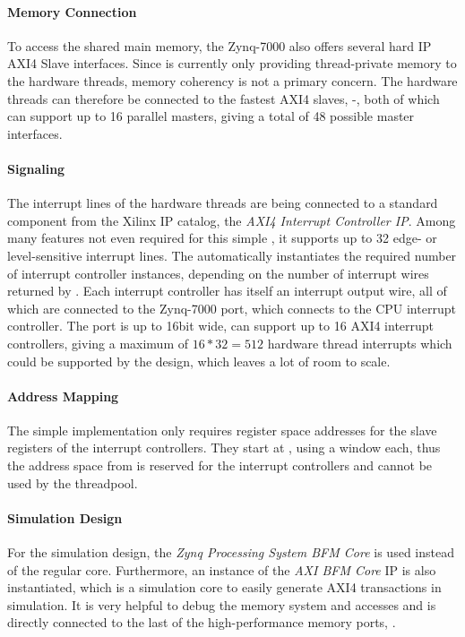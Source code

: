 \paragraph{Memory Connection}
To access the shared main memory, the Zynq-7000 also offers several hard IP AXI4 Slave interfaces.
Since \tpc{} is currently only providing thread-private memory to the hardware threads, memory coherency is not a primary concern.
The hardware threads can therefore be connected to the fastest AXI4 slaves, -, both of which can support up to 16 parallel masters, giving a total of 48 possible master interfaces.

\paragraph{Signaling}
The interrupt lines of the hardware threads are being connected to a standard component from the Xilinx IP catalog, the \emph{AXI4 Interrupt Controller IP}.
Among many features not even required for this simple , it supports up to 32 edge- or level-sensitive interrupt lines.
The  automatically instantiates the required number of interrupt controller instances, depending on the number of interrupt wires returned by .
Each interrupt controller has itself an interrupt output wire, all of which are connected to the Zynq-7000  port, which connects to the CPU interrupt controller.
The  port is up to 16bit wide, can support up to 16 AXI4 interrupt controllers, giving a maximum of $16 * 32 = 512$ hardware thread interrupts which could be supported by the design, which leaves a lot of room to scale.

\paragraph{Address Mapping}
The simple  implementation only requires register space addresses for the slave registers of the interrupt controllers.
They start at , using a  window each, thus the address space from  is reserved for the interrupt controllers and cannot be used by the threadpool.

\paragraph{Simulation Design}
For the simulation design, the \emph{Zynq Processing System BFM Core} is used instead of the regular core.
Furthermore, an instance of the \emph{AXI BFM Core} IP is also instantiated, which is a simulation core to easily generate AXI4 transactions in simulation.
It is very helpful to debug the memory system and accesses and is directly connected to the last of the high-performance memory ports, .

